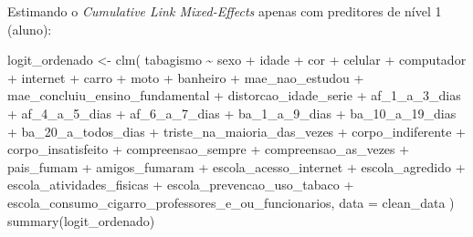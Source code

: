 \documentclass[
]{article}
\newenvironment{Shaded}{\begin{snugshade}}{\end{snugshade}}
\newcommand{\AttributeTok}[1]{\textcolor[rgb]{0.40,0.45,0.13}{#1}}
\newcommand{\FunctionTok}[1]{\textcolor[rgb]{0.28,0.35,0.67}{#1}}
\newcommand{\NormalTok}[1]{\textcolor[rgb]{0.00,0.23,0.31}{#1}}
\newcommand{\OtherTok}[1]{\textcolor[rgb]{0.00,0.23,0.31}{#1}}
\newcommand{\SpecialCharTok}[1]{\textcolor[rgb]{0.37,0.37,0.37}{#1}}
\begin{document}
Estimando o \emph{Cumulative Link Mixed-Effects} apenas com preditores
de nível 1 (aluno):

\begin{Shaded}
\begin{Highlighting}[]
\NormalTok{logit\_ordenado }\OtherTok{\textless{}{-}} \FunctionTok{clm}\NormalTok{(}
\NormalTok{  tabagismo }\SpecialCharTok{\textasciitilde{}}\NormalTok{ sexo }\SpecialCharTok{+}\NormalTok{ idade }\SpecialCharTok{+}\NormalTok{ cor }\SpecialCharTok{+}\NormalTok{ celular }\SpecialCharTok{+}\NormalTok{ computador }\SpecialCharTok{+}
\NormalTok{  internet }\SpecialCharTok{+}\NormalTok{ carro }\SpecialCharTok{+}\NormalTok{ moto }\SpecialCharTok{+}\NormalTok{ banheiro }\SpecialCharTok{+}
\NormalTok{  mae\_nao\_estudou }\SpecialCharTok{+}
\NormalTok{  mae\_concluiu\_ensino\_fundamental }\SpecialCharTok{+}
\NormalTok{  distorcao\_idade\_serie }\SpecialCharTok{+}\NormalTok{ af\_1\_a\_3\_dias }\SpecialCharTok{+}\NormalTok{ af\_4\_a\_5\_dias }\SpecialCharTok{+}
\NormalTok{  af\_6\_a\_7\_dias }\SpecialCharTok{+}\NormalTok{ ba\_1\_a\_9\_dias }\SpecialCharTok{+}\NormalTok{ ba\_10\_a\_19\_dias }\SpecialCharTok{+}
\NormalTok{  ba\_20\_a\_todos\_dias }\SpecialCharTok{+}
\NormalTok{  triste\_na\_maioria\_das\_vezes }\SpecialCharTok{+}\NormalTok{ corpo\_indiferente }\SpecialCharTok{+}
\NormalTok{  corpo\_insatisfeito }\SpecialCharTok{+}\NormalTok{ compreensao\_sempre }\SpecialCharTok{+}
\NormalTok{  compreensao\_as\_vezes }\SpecialCharTok{+}\NormalTok{ pais\_fumam }\SpecialCharTok{+}\NormalTok{ amigos\_fumaram }\SpecialCharTok{+}
\NormalTok{  escola\_acesso\_internet }\SpecialCharTok{+} 
\NormalTok{  escola\_agredido }\SpecialCharTok{+}
\NormalTok{  escola\_atividades\_fisicas }\SpecialCharTok{+}
\NormalTok{  escola\_prevencao\_uso\_tabaco }\SpecialCharTok{+}
\NormalTok{  escola\_consumo\_cigarro\_professores\_e\_ou\_funcionarios,}
  \AttributeTok{data =}\NormalTok{ clean\_data}
\NormalTok{)}
\FunctionTok{summary}\NormalTok{(logit\_ordenado)}
\end{Highlighting}
\end{Shaded}
\end{document}
